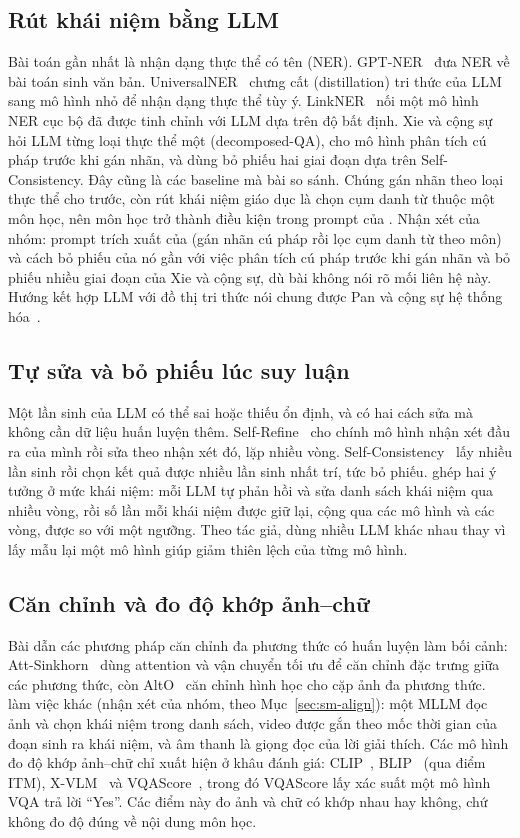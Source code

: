 \subsection{Rút khái niệm bằng LLM}
Bài toán gần nhất là nhận dạng thực thể có tên (NER).
GPT-NER~\cite{wang2023gptner} đưa NER về bài toán sinh văn bản.
UniversalNER~\cite{zhou2023universalner} chưng cất (distillation) tri thức của LLM sang mô hình nhỏ để nhận dạng thực thể tùy ý.
LinkNER~\cite{zhang2024linkner} nối một mô hình NER cục bộ đã được tinh chỉnh với LLM dựa trên độ bất định.
Xie và cộng sự~\cite{xie2023decomposedqa} hỏi LLM từng loại thực thể một (decomposed-QA), cho mô hình phân tích cú pháp trước khi gán nhãn, và dùng bỏ phiếu hai giai đoạn dựa trên Self-Consistency.
Đây cũng là các baseline mà bài \SM{} so sánh.
Chúng gán nhãn theo loại thực thể cho trước, còn rút khái niệm giáo dục là chọn cụm danh từ thuộc một môn học, nên môn học trở thành điều kiện trong prompt của \SM{}.
Nhận xét của nhóm: prompt trích xuất của \SM{} (gán nhãn cú pháp rồi lọc cụm danh từ theo môn) và cách bỏ phiếu của nó gần với việc phân tích cú pháp trước khi gán nhãn và bỏ phiếu nhiều giai đoạn của Xie và cộng sự, dù bài \SM{} không nói rõ mối liên hệ này.
Hướng kết hợp LLM với đồ thị tri thức nói chung được Pan và cộng sự hệ thống hóa~\cite{pan2024unifying}.

\subsection{Tự sửa và bỏ phiếu lúc suy luận}
Một lần sinh của LLM có thể sai hoặc thiếu ổn định, và có hai cách sửa mà không cần dữ liệu huấn luyện thêm.
Self-Refine~\cite{madaan2023selfrefine} cho chính mô hình nhận xét đầu ra của mình rồi sửa theo nhận xét đó, lặp nhiều vòng.
Self-Consistency~\cite{wang2023selfconsistency} lấy nhiều lần sinh rồi chọn kết quả được nhiều lần sinh nhất trí, tức bỏ phiếu.
\SM{} ghép hai ý tưởng ở mức khái niệm: mỗi LLM tự phản hồi và sửa danh sách khái niệm qua nhiều vòng, rồi số lần mỗi khái niệm được giữ lại, cộng qua các mô hình và các vòng, được so với một ngưỡng.
Theo tác giả, dùng nhiều LLM khác nhau thay vì lấy mẫu lại một mô hình giúp giảm thiên lệch của từng mô hình.

\subsection{Căn chỉnh và đo độ khớp ảnh--chữ}
Bài \SM{} dẫn các phương pháp căn chỉnh đa phương thức có huấn luyện làm bối cảnh: Att-Sinkhorn~\cite{ma2023attsinkhorn} dùng attention và vận chuyển tối ưu để căn chỉnh đặc trưng giữa các phương thức, còn AltO~\cite{song2024alto} căn chỉnh hình học cho cặp ảnh đa phương thức.
\SM{} làm việc khác (nhận xét của nhóm, theo Mục~\ref{sec:sm-align}): một MLLM đọc ảnh và chọn khái niệm trong danh sách, video được gắn theo mốc thời gian của đoạn sinh ra khái niệm, và âm thanh là giọng đọc của lời giải thích.
Các mô hình đo độ khớp ảnh--chữ chỉ xuất hiện ở khâu đánh giá: CLIP~\cite{radford2021clip}, BLIP~\cite{li2022blip} (qua điểm ITM), X-VLM~\cite{zeng2022xvlm} và VQAScore~\cite{lin2024vqascore}, trong đó VQAScore lấy xác suất một mô hình VQA trả lời ``Yes''.
Các điểm này đo ảnh và chữ có khớp nhau hay không, chứ không đo độ đúng về nội dung môn học.
